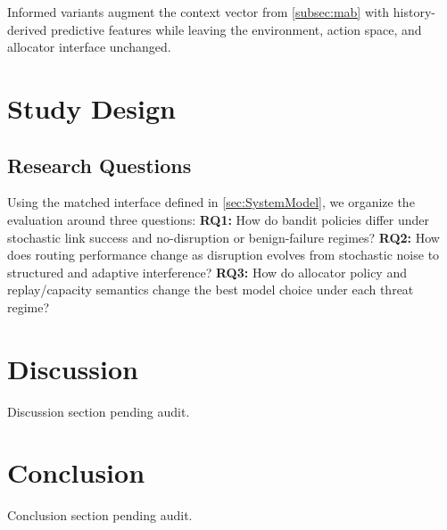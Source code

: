 \documentclass[10pt,conference]{IEEEtran}
\begin{document}
Informed variants augment the context vector from \cref{subsec:mab} with history-derived predictive features while leaving the environment, action space, and allocator interface unchanged.

\section{Study Design}
\label{sec:studydesign}

\subsection{Research Questions}
\label{sec:research_questions}

Using the matched interface defined in \cref{sec:SystemModel}, we organize the evaluation around three questions: \textbf{RQ1:} How do bandit policies differ under stochastic link success and no-disruption or benign-failure regimes? \textbf{RQ2:} How does routing performance change as disruption evolves from stochastic noise to structured and adaptive interference? \textbf{RQ3:} How do allocator policy and replay/capacity semantics change the best model choice under each threat regime?





\section{Discussion}
\label{sec:discussion}
Discussion section pending audit.

\section{Conclusion}
\label{sec:conclusion}
Conclusion section pending audit.



\end{document}
